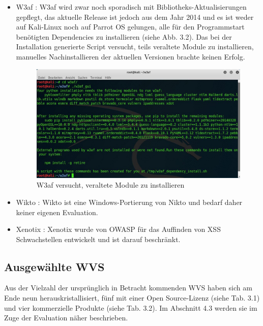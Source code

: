 \documentclass[12pt,oneside,a4paper,parskip,pointlessnumbers]{scrbook}
\begin{document}
\begin{itemize}
      \newpage
      \item W3af \cite{W3af}: W3af wird zwar noch sporadisch mit Bibliotheks-Aktualisierungen gepflegt, das aktuelle Release ist jedoch aus dem Jahr 2014 und es ist weder auf Kali-Linux noch auf Parrot OS gelungen, alle für den Programmstart benötigten Dependencies zu installieren (siehe Abb. 3.2). Das bei der Installation generierte Script versucht, teils veraltete Module zu installieren, manuelles Nachinstallieren der aktuellen Versionen brachte keinen Erfolg.
      \begin{figure}[H]
        \centering
        \includegraphics[width=1\textwidth]{Images/w3af}
        \caption[W3af: Fehlende Module]{W3af versucht, veraltete Module zu installieren}
      \end{figure}
      \item Wikto \cite{Wikto}: Wikto ist eine Windows-Portierung von Nikto und bedarf daher keiner eigenen Evaluation.
      \item Xenotix \cite{Xenotix}: Xenotix wurde von OWASP für das Auffinden von XSS Schwachstellen entwickelt und ist darauf beschränkt.
    \end{itemize}
    \newpage


  \subsection{Ausgewählte WVS}
  Aus der Vielzahl der ursprünglich in Betracht kommenden WVS haben sich am Ende neun herauskristallisiert, fünf mit einer Open Source-Lizenz (siehe Tab. 3.1) und vier kommerzielle Produkte (siehe Tab. 3.2). Im Abschnitt 4.3 werden sie im Zuge der Evaluation näher beschrieben.
\end{document}
